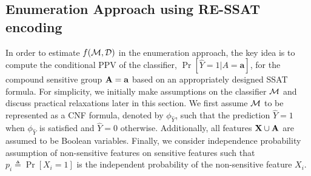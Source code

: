 \subsection{Enumeration Approach  using RE-SSAT encoding}
\label{fairness_justicia_sec:enumeration_ssat}
In order to estimate $ f(\mathcal{M}, \mathcal{D}) $ in the enumeration approach, the key idea  is to compute the conditional PPV of the classifier, $\Pr[\hat{Y} = 1 | A = \mathbf{a}]$, for the compound sensitive group $\mathbf{A} = \mathbf{a}$ based on an appropriately designed SSAT formula.  For simplicity, we  initially make assumptions on the classifier $ \mathcal{M} $ and discuss practical relaxations later in this section.  We first assume $\mathcal{M}$ to be represented as a CNF formula, denoted by $\phi_{\hat{Y}}$, such that the prediction $ \hat{Y} = 1 $ when $ \phi_{\hat{Y}}$ is satisfied and  $\hat{Y} =0$ otherwise. Additionally, all features $ \mathbf{X} \cup \mathbf{A} $ are assumed to be Boolean variables.  Finally, we consider independence probability assumption of non-sensitive features on sensitive features such that $p_i \triangleq \Pr[X_i = 1] $ is the independent probability of the non-sensitive feature $ X_i $. 


\noindent\makebox[\linewidth]{\rule{\paperwidth}{2.5pt}}

